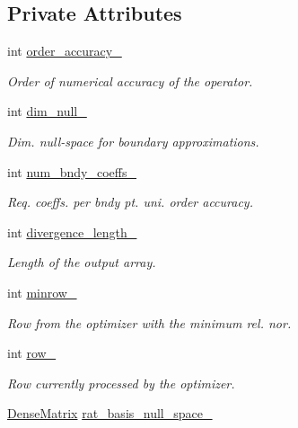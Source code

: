\subsection*{Private Attributes}
\begin{DoxyCompactItemize}
\item 
int \hyperlink{classmtk_1_1Div1D_a9c8a8d7cd08a72dbd1daa8deee06f9c6}{order\+\_\+accuracy\+\_\+}
\begin{DoxyCompactList}\small\item\em Order of numerical accuracy of the operator. \end{DoxyCompactList}\item 
int \hyperlink{classmtk_1_1Div1D_a264027144def76d802778391f55381a0}{dim\+\_\+null\+\_\+}
\begin{DoxyCompactList}\small\item\em Dim. null-\/space for boundary approximations. \end{DoxyCompactList}\item 
int \hyperlink{classmtk_1_1Div1D_a717240b41eaa2adde858630b9e3d3042}{num\+\_\+bndy\+\_\+coeffs\+\_\+}
\begin{DoxyCompactList}\small\item\em Req. coeffs. per bndy pt. uni. order accuracy. \end{DoxyCompactList}\item 
int \hyperlink{classmtk_1_1Div1D_ac0f152190cd2fbff62deb07f96284f86}{divergence\+\_\+length\+\_\+}
\begin{DoxyCompactList}\small\item\em Length of the output array. \end{DoxyCompactList}\item 
int \hyperlink{classmtk_1_1Div1D_a0ba7a75cca6cf3646deb7a030cbbf3f3}{minrow\+\_\+}
\begin{DoxyCompactList}\small\item\em Row from the optimizer with the minimum rel. nor. \end{DoxyCompactList}\item 
int \hyperlink{classmtk_1_1Div1D_a86d99df0e9b1e5d2943a2dcf58975556}{row\+\_\+}
\begin{DoxyCompactList}\small\item\em Row currently processed by the optimizer. \end{DoxyCompactList}\item 
\hyperlink{classmtk_1_1DenseMatrix}{Dense\+Matrix} \hyperlink{classmtk_1_1Div1D_a4f0f5589f13024b7e0edc2ac19649f9b}{rat\+\_\+basis\+\_\+null\+\_\+space\+\_\+}

\end{DoxyCompactItemize}
